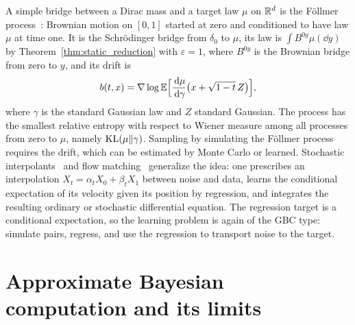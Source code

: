 A simple bridge between a Dirac mass and a target law $\mu$ on $\mathbb{R}^d$ is the F\"ollmer process~\cite{follmer1985,lehec2013}: Brownian motion on $[0,1]$ started at zero and conditioned to have law $\mu$ at time one. It is the Schr\"odinger bridge from $\delta_0$ to $\mu$, its law is $\int B^{0y}\mu(\dd y)$ by Theorem~\ref{thm:static_reduction} with $\varepsilon=1$, where $B^{0y}$ is the Brownian bridge from zero to $y$, and its drift is
\[
b(t,x) = \nabla\log\mathbb{E}\Big[\frac{\,\mathrm{d}\mu}{\,\mathrm{d}\gamma}\big(x+\sqrt{1-t}\,Z\big)\Big],
\]
where $\gamma$ is the standard Gaussian law and $Z$ standard Gaussian. The process has the smallest relative entropy with respect to Wiener measure among all processes from zero to $\mu$, namely $\mathrm{KL}(\mu\|\gamma)$. Sampling by simulating the F\"ollmer process requires the drift, which can be estimated by Monte Carlo or learned. Stochastic interpolants~\cite{albergo2023} and flow matching~\cite{lipman2023} generalize the idea: one prescribes an interpolation $X_t = \alpha_tX_0+\beta_tX_1$ between noise and data, learns the conditional expectation of its velocity given its position by regression, and integrates the resulting ordinary or stochastic differential equation. The regression target is a conditional expectation, so the learning problem is again of the GBC type: simulate pairs, regress, and use the regression to transport noise to the target.

\section{Approximate Bayesian computation and its limits}

